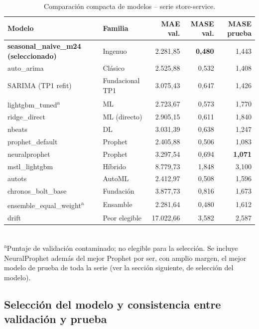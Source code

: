 \begin{table}[htbp]
  \centering
  \caption{Comparación compacta de modelos -- serie store-service.}
  \label{tab:comparacion_store}
  \small
  \begin{tabular}{llrrr}
    \toprule
    Modelo & Familia & MAE val. & MASE val. & MASE prueba \\
    \midrule
    \textbf{seasonal\_naive\_m24 (seleccionado)} & Ingenuo & 2.281,85 & \textbf{0,480} & 1,443 \\
    auto\_arima & Clásico & 2.525,88 & 0,532 & 1,408 \\
    SARIMA (TP1 refit) & Fundacional TP1 & 3.075,43 & 0,647 & 1,426 \\
    lightgbm\_tuned\textsuperscript{a} & ML & 2.723,67 & 0,573 & 1,770 \\
    ridge\_direct & ML (directo) & 2.905,15 & 0,611 & 1,840 \\
    nbeats & DL & 3.031,39 & 0,638 & 1,247 \\
    prophet\_default & Prophet & 2.405,88 & 0,506 & 1,083 \\
    neuralprophet & Prophet & 3.297,54 & 0,694 & \textbf{1,071} \\
    mstl\_lightgbm & Híbrido & 8.779,73 & 1,848 & 3,100 \\
    autots & AutoML & 2.412,97 & 0,508 & 1,596 \\
    chronos\_bolt\_base & Fundación & 3.877,73 & 0,816 & 1,673 \\
    ensemble\_equal\_weight\textsuperscript{a} & Ensamble & 2.281,64 & 0,480 & 1,612 \\
    drift & Peor elegible & 17.022,66 & 3,582 & 2,587 \\
    \bottomrule
  \end{tabular}
  \\[2pt]
  \footnotesize\textsuperscript{a}Puntaje de validación contaminado; no elegible para la selección. Se
  incluye NeuralProphet además del mejor Prophet por ser, con amplio margen, el mejor modelo de prueba de
  toda la serie (ver la sección siguiente, de selección del modelo).
\end{table}

\subsection{Selección del modelo y consistencia entre validación y prueba}
\label{sec:seleccion}

